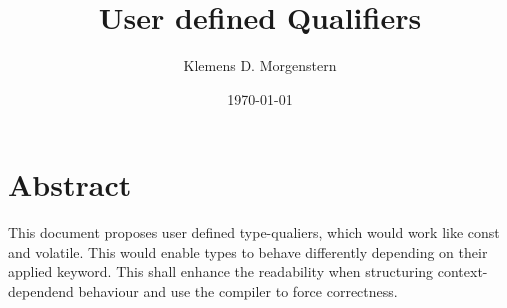 \documentclass{article}
\begin{document}
\title{User defined Qualifiers}
\author{Klemens D. Morgenstern}
\date{\today}
\maketitle  
\newpage 
\tableofcontents
\newpage
\section*{Abstract}
This document proposes user defined type-qualiers, which would work like const and volatile. This would enable types to behave differently depending on their applied keyword. This shall enhance the readability when structuring context-dependend behaviour and use the compiler to force correctness.




\end{document}

